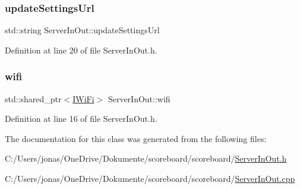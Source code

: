 \subsubsection{\texorpdfstring{update\+Settings\+Url}{updateSettingsUrl}}
{\footnotesize\ttfamily std\+::string Server\+In\+Out\+::update\+Settings\+Url\hspace{0.3cm}{\ttfamily [private]}}



Definition at line 20 of file Server\+In\+Out.\+h.

\mbox{\label{class_server_in_out_abbaeaec2b3d84e8c4c62629cfd7c6b2c}} 
\subsubsection{\texorpdfstring{wifi}{wifi}}
{\footnotesize\ttfamily std\+::shared\+\_\+ptr$<$\hyperlink{class_i_wi_fi}{I\+Wi\+Fi}$>$ Server\+In\+Out\+::wifi\hspace{0.3cm}{\ttfamily [private]}}



Definition at line 16 of file Server\+In\+Out.\+h.



The documentation for this class was generated from the following files\+:\begin{DoxyCompactItemize}
\item 
C\+:/\+Users/jonas/\+One\+Drive/\+Dokumente/scoreboard/scoreboard/\hyperlink{_server_in_out_8h}{Server\+In\+Out.\+h}\item 
C\+:/\+Users/jonas/\+One\+Drive/\+Dokumente/scoreboard/scoreboard/\hyperlink{_server_in_out_8cpp}{Server\+In\+Out.\+cpp}\end{DoxyCompactItemize}
